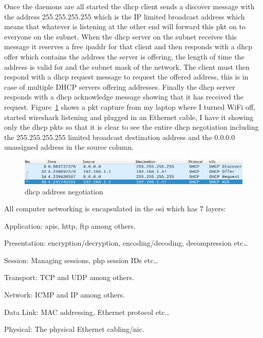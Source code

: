 \documentclass[titlepage]{article}
\begin{document}
Once the \glspl{daemon} are all started the \gls{dhcp} client sends a discover message with the address
255.255.255.255 which is the IP limited broadcast address which means that whatever is listening at the
other end will forward this \gls{pkt} on to everyone on the \gls{subnet}. When the \gls{dhcp} \gls{server} on the subnet
receives this message it reserves a free \gls{ipaddr} for that client and then responds with a \gls{dhcp} offer
which contains the address the \gls{server} is offering, the length of time the address is valid for and the
\gls{subnet} mask of the network. The client must then respond with a \gls{dhcp} request message to request the
offered address, this is in case of multiple DHCP servers offering addresses. Finally the \gls{dhcp} server responds
with a \gls{dhcp} acknowledge message showing that it has received the request. Figure~\ref{dhcp_negotiate} shows
a \gls{pkt} capture from my laptop where I turned WiFi off, started wireshark listening and plugged in an Ethernet
cable, I have it showing only the \gls{dhcp} \glspl{pkt} so that it is clear to see the entire \gls{dhcp} negotiation
including the 255.255.255.255 limited broadcast destination address and the 0.0.0.0 unassigned address in the source
column.

\begin{figure}[H]
  \centering
  \includegraphics[width=\textwidth]{screenshots/dhcp_negotiation.png}
  \caption{\gls{dhcp} address negotiation}\label{dhcp_negotiate}
\end{figure}

All computer networking is encapsulated in the \gls{osi} which has 7 layers:

\begin{etaremune}
  \item{Application: \gls{api}s, \gls{http}, \gls{ftp} among others.}
  \item{Presentation: encryption/decryption, encoding/decoding, decompression etc\ldots}
  \item{Session: Managing sessions, \gls{php} session IDs etc\ldots}
  \item{Transport: TCP and UDP among others.}
  \item{Network: ICMP and IP among others.}
  \item{Data Link: MAC addressing, Ethernet protocol etc\ldots}
  \item{Physical: The physical Ethernet cabling/\gls{nic}.}
\end{etaremune}
\end{document}
